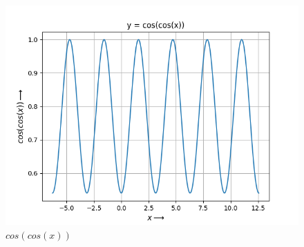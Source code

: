 \documentclass[11pt, a4paper]{article}
\begin{document}
\begin{figure}[!tbh]
    \centering
    \includegraphics[scale = 0.7]{Q1-2.png}
    \caption{$cos(cos(x))$}
    \label{fig:Figure 2}
\end{figure}


\newpage
\end{document}
